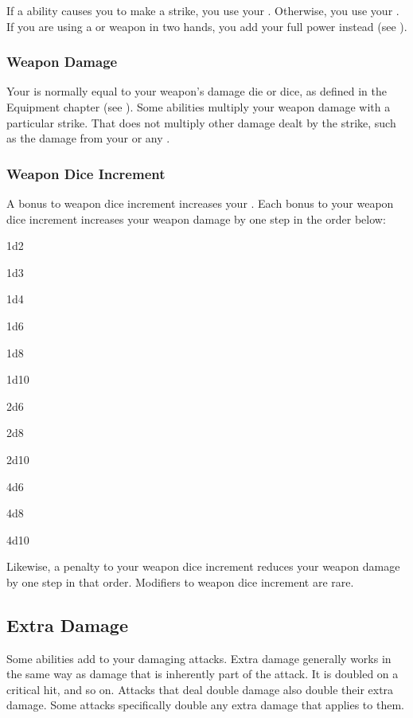     If a \magical ability causes you to make a strike, you use your .
    Otherwise, you use your .
    If you are using a  or  weapon in two hands, you add your full power instead (see ).

    \subsubsection{Weapon Damage}\label{Weapon Damage}
      Your  is normally equal to your weapon's damage die or dice, as defined in the Equipment chapter (see ).
      Some abilities multiply your weapon damage with a particular strike.
      That does not multiply other damage dealt by the strike, such as the damage from your  or any .

    \subsubsection{Weapon Dice Increment}
      A bonus to weapon dice increment increases your .
      Each  bonus to your weapon dice increment increases your weapon damage by one step in the order below:
      \begin{raggeditemize}
        \item 1d2
        \item 1d3
        \item 1d4
        \item 1d6
        \item 1d8
        \item 1d10
        \item 2d6
        \item 2d8
        \item 2d10
        \item 4d6
        \item 4d8
        \item 4d10
      \end{raggeditemize}

      Likewise, a  penalty to your weapon dice increment reduces your weapon damage by one step in that order.
      Modifiers to weapon dice increment are rare.

  \subsection{Extra Damage}\label{Extra Damage}
    Some abilities add  to your damaging attacks.
    Extra damage generally works in the same way as damage that is inherently part of the attack.
    It is doubled on a critical hit, and so on.
    Attacks that deal double damage also double their extra damage.
    Some attacks specifically double any extra damage that applies to them.

